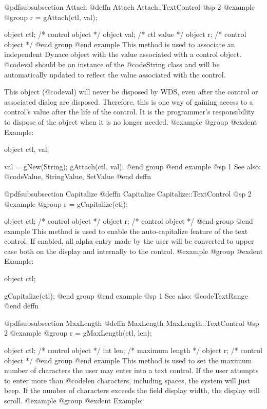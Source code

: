 @pdfsubsubsection {Attach}
@deffn {Attach} Attach::TextControl
@sp 2
@example
@group
r = gAttach(ctl, val);

object  ctl;   /*  control object  */
object  val;   /*  ctl value       */
object  r;     /*  control object  */
@end group
@end example
This method is used to associate an independent Dynace object with the
value associated with a control object.  @code{val} should be an
instance of the @code{String} class and will be automatically updated
to reflect the value associated with the control.

This object (@code{val}) will never be disposed by WDS, even after
the control or associated dialog are disposed.  Therefore, this
is one way of gaining access to a control's value after the life
of the control.  It is the programmer's responsibility to dispose of
the object when it is no longer needed.
@example
@group
@exdent Example:

object  ctl, val;

val = gNew(String);
gAttach(ctl, val);
@end group
@end example
@sp 1
See also:  @code{Value, StringValue, SetValue}
@end deffn












@pdfsubsubsection {Capitalize}
@deffn {Capitalize} Capitalize::TextControl
@sp 2
@example
@group
r = gCapitalize(ctl);

object  ctl;   /*  control object  */
object  r;     /*  control object  */
@end group
@end example
This method is used to enable the auto-capitalize feature of the text
control.  If enabled, all alpha entry made by the user will be converted
to upper case both on the display and internally to the control.
@example
@group
@exdent Example:

object  ctl;

gCapitalize(ctl);
@end group
@end example
@sp 1
See also:  @code{TextRange}
@end deffn













@pdfsubsubsection {MaxLength}
@deffn {MaxLength} MaxLength::TextControl
@sp 2
@example
@group
r = gMaxLength(ctl, len);

object  ctl;   /*  control object  */
int     len;   /*  maximum length  */
object  r;     /*  control object  */
@end group
@end example
This method is used to set the maximum number of characters the user may
enter into a text control.  If the user attempts to enter more than
@code{len} characters, including spaces, the system will just beep.  If
the number of characters exceeds the field display width, the display
will scroll.
@example
@group
@exdent Example:

